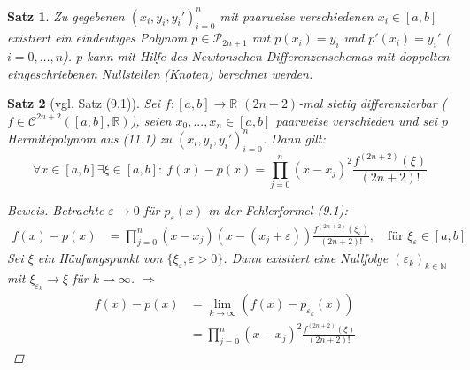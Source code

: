 \documentclass[12pt]{article}
\theoremstyle{break}
\newtheorem{theorem}{Satz}[subsection]
\begin{document}
\begin{theorem}
Zu gegebenen $(x_i, y_i, y_i')_{i=0}^n$ mit paarweise verschiedenen $x_i \in [a,b]$ existiert ein eindeutiges Polynom $p \in \mathcal{P}_{2n+1}$ mit $p(x_i) = y_i$ und $p'(x_i) = y_i'$ ($i=0,\dots, n$). $p$ kann mit Hilfe des Newtonschen Differenzenschemas mit doppelten eingeschriebenen Nullstellen (Knoten) berechnet werden.
\end{theorem}

\begin{theorem}[vgl. Satz (9.1)]
Sei $f\colon [a,b] \rightarrow \mathbb{R}$ $(2n+2)$-mal stetig differenzierbar ($f \in \mathcal{C}^{2n+2}([a,b], \mathbb{R})$), seien $x_0,..., x_n \in [a,b]$ paarweise verschieden und sei $p$ Hermit\'{e}polynom aus (11.1) zu $(x_i,y_i, y_i')_{i=0}^n$. Dann gilt:
\[ \forall x \in [a,b] \exists \xi \in [a,b]: \medspace f(x)-p(x) = \prod_{j=0}^n (x-x_j)^2 \frac{f^{(2n+2)} (\xi)}{(2n+2)!} \]

\begin{proof}[Beweis]
Betrachte $\varepsilon \rightarrow 0$ für $p_{\varepsilon}(x)$ in der Fehlerformel (9.1):
\begin{align*}
f(x)-p(x) &= \prod_{j=0}^n (x-x_j)(x-(x_j+\varepsilon)) \frac{f^{(2n+2)}(\xi_{\varepsilon})}{(2n+2)!}, \quad \text{für } \xi_{\varepsilon} \in [a,b]
\end{align*}
Sei $\xi$ ein Häufungspunkt von $\{\xi_{\varepsilon}, \varepsilon > 0\}$. Dann existiert eine Nullfolge $(\varepsilon_k)_{k\in \mathbb{N}}$ mit $\xi_{\varepsilon_k} \rightarrow \xi$ für $k \rightarrow \infty$. $\Rightarrow$
\begin{align*}
f(x)-p(x) &= \lim_{k \rightarrow \infty} (f(x) - p_{\varepsilon_k}(x)) &\\
&= \prod_{j=0}^n (x-x_j)^2 \frac{f^{(2n+2)}(\xi)}{(2n+2)!}
\end{align*}
\end{proof}
\end{theorem}
\end{document}
